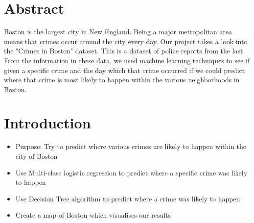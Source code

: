 \documentclass[a0,landscape]{a0poster}
\let\Section=\section
\def\section{\setcounter{equation}{0}\Section}
\newcommand{\1}{\bold{1}}
\begin{document}
\begin{multicols}{3} %

\vspace{0.05cm} %




\section*{Abstract}
Boston is the largest city in New England. Being a major metropolitan area means that crimes occur around the city every day. Our project takes a look into the "Crimes in Boston" dataset. This is a dataset of police reports from the last From the information in these data, we used machine learning techniques to see if given a specific crime and the day which that crime occurred if we could predict where that crime is most likely to happen within the various neighborhoods in Boston. 



\color{SaddleBrown} %




\color{black}\section{Introduction}
\begin{itemize}
\item Purpose: Try to predict where various crimes are likely to happen within the city of Boston
\item Use Multi-class logistic regression to predict where a specific crime was likely to happen
\item Use Decision Tree algorithm to predict where a crime was likely to happen
\item Create a map of Boston which visualises our results 
\end{itemize}
\columnsep=5pt
\columnseprule=0pt




\end{multicols}
\end{document}
